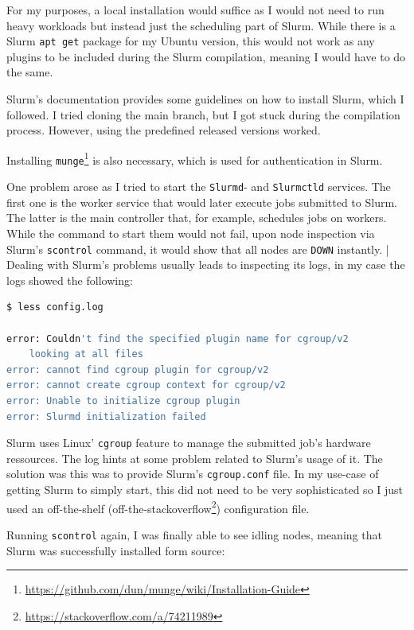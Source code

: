 For my purposes, a local installation would suffice as I would not need to run heavy workloads but instead just the scheduling part of Slurm. 
While there is a Slurm \verb|apt get| package for my Ubuntu version, this would not work as any plugins to be included during the Slurm compilation, meaning I would have to do the same.

Slurm's documentation provides some guidelines on how to install Slurm, which I followed. 
I tried cloning the main branch, but I got stuck during the compilation process. However, using the predefined released versions worked.

Installing \verb|munge|\footnote{\url{https://github.com/dun/munge/wiki/Installation-Guide}} is also necessary, which is used for authentication in Slurm.

One problem arose as I tried to start the \verb|Slurmd|- and \verb|Slurmctld| services. The first one is the worker service that would later execute jobs submitted to Slurm. The latter is the main controller that, for example, schedules jobs on workers. While the command to start them would not fail, upon node inspection via Slurm's \verb|scontrol| command, it would show that all nodes are \verb|DOWN| instantly.
|
Dealing with Slurm's problems usually leads to inspecting its logs, in my case the logs showed the following:

\begin{lstlisting}[language=bash, frame=single, numbers=none, caption={Slurm error logs}, basicstyle=\ttfamily]
$ less config.log

error: Couldn't find the specified plugin name for cgroup/v2
    looking at all files
error: cannot find cgroup plugin for cgroup/v2
error: cannot create cgroup context for cgroup/v2
error: Unable to initialize cgroup plugin
error: Slurmd initialization failed

\end{lstlisting}

Slurm uses Linux' \verb|cgroup| feature to manage the submitted job's hardware ressources. The log hints at some problem related to Slurm's usage of it.
The solution was this was to provide Slurm's \verb|cgroup.conf| file. In my use-case of getting Slurm to simply start, this did not need to be very sophisticated so I just used an off-the-shelf (off-the-stackoverflow\footnote{\url{https://stackoverflow.com/a/74211989}}) configuration file.

Running \verb|scontrol| again, I was finally able to see idling nodes, meaning that Slurm was successfully installed form source:

